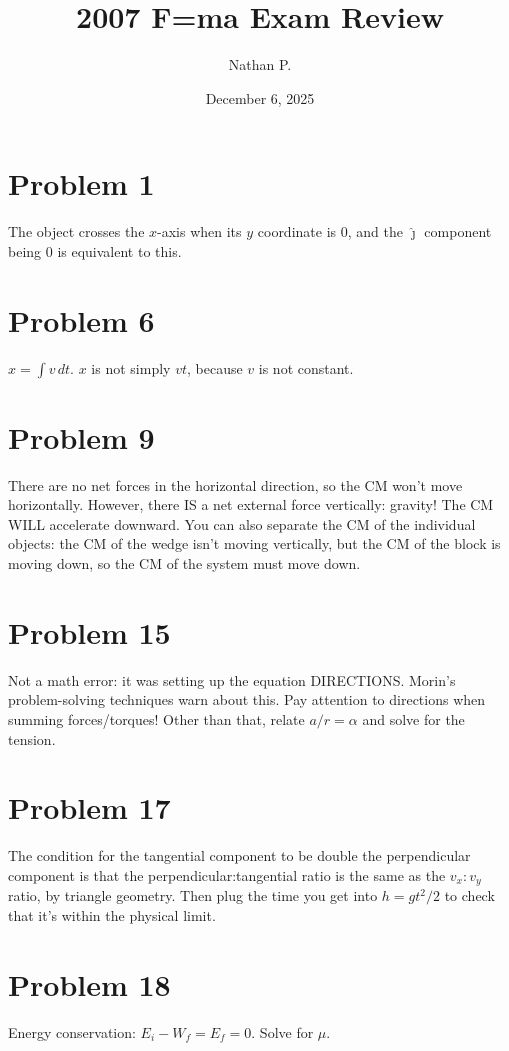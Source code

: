 \documentclass[11pt]{article}
\title{2007 F=ma Exam Review}
\author{Nathan P.}
\date{December 6, 2025}
\begin{document}
\maketitle

\section*{Problem 1}
The object crosses the $x$-axis when its $y$ coordinate is $0$, and the $\hat\jmath$ component being $0$ is equivalent to this.

\section*{Problem 6}
$x=\int v\,dt$. $x$ is not simply $vt$, because $v$ is not constant.

\section*{Problem 9}
There are no net forces in the horizontal direction, so the CM won't move horizontally. However, there IS a net external force vertically: gravity! The CM WILL accelerate downward.
You can also separate the CM of the individual objects: the CM of the wedge isn't moving vertically, but the CM of the block is moving down, so the CM of the system must move down.

\section*{Problem 15}
Not a math error: it was setting up the equation DIRECTIONS. Morin's problem-solving techniques warn about this. Pay attention to directions when summing forces/torques! Other than that, relate $a/r=\alpha$ and solve for the tension.

\section*{Problem 17}
The condition for the tangential component to be double the perpendicular component is that the perpendicular:tangential ratio is the same as the $v_x:v_y$ ratio, by triangle geometry. Then plug the time you get into $h=gt^2/2$ to check that it's within the physical limit.

\section*{Problem 18}
Energy conservation: $E_i-W_f=E_f=0$. Solve for $\mu$.
\end{document}

